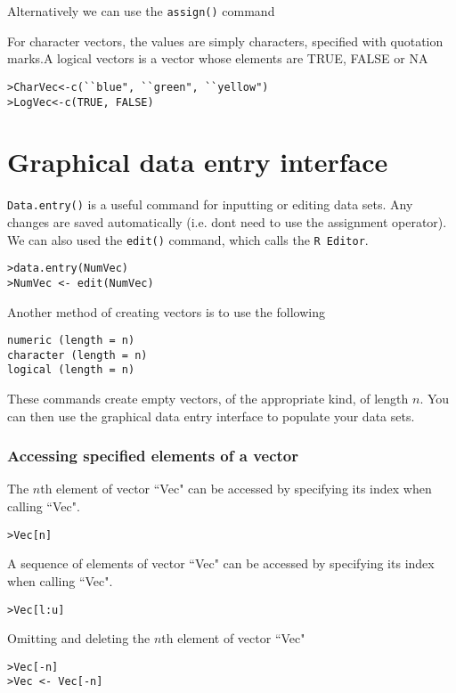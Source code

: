\documentclass[a4paper,12pt]{article}
\begin{document}
\begin{itemize}
Alternatively we can use the \texttt{assign()} command

For character vectors, the values are simply characters, specified with
quotation marks.A logical vectors is a vector whose elements are TRUE, FALSE or NA

\begin{verbatim}
>CharVec<-c(``blue", ``green", ``yellow")
>LogVec<-c(TRUE, FALSE)
\end{verbatim}

\section{Graphical data entry interface}

\texttt{Data.entry()} is a useful  command for inputting or editing data sets. Any
changes are saved automatically (i.e. dont need to use the assignment
operator). We can also used the \texttt{edit()} command, which calls the \texttt{R Editor}.

\begin{verbatim}
>data.entry(NumVec)
>NumVec <- edit(NumVec)
\end{verbatim}

Another method of creating vectors is to use the following
\begin{verbatim}
numeric (length = n)
character (length = n)
logical (length = n)
\end{verbatim}
These commands create empty vectors, of the appropriate kind, of length $n$. You can then use the graphical data entry interface to populate your data sets.

\subsubsection{Accessing specified elements of a vector}

The $n$th element of vector ``Vec" can be accessed by specifying its index when
calling ``Vec".
\begin{verbatim}>Vec[n]
\end{verbatim}
A sequence of  elements of vector ``Vec" can be accessed by specifying its index
when calling ``Vec".
\begin{verbatim}>Vec[l:u]
\end{verbatim}
Omitting and deleting the $n$th element of vector ``Vec"
\begin{verbatim}
>Vec[-n]
>Vec <- Vec[-n]
\end{verbatim}


\end{itemize}
\end{document}
